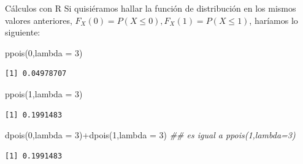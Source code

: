 \documentclass[
  ignorenonframetext,
  aspectratio=169]{beamer}
\newenvironment{Shaded}{\begin{snugshade}}{\end{snugshade}}
\newcommand{\AttributeTok}[1]{\textcolor[rgb]{0.40,0.45,0.13}{#1}}
\newcommand{\DecValTok}[1]{\textcolor[rgb]{0.68,0.00,0.00}{#1}}
\newcommand{\DocumentationTok}[1]{\textcolor[rgb]{0.37,0.37,0.37}{\textit{#1}}}
\newcommand{\FunctionTok}[1]{\textcolor[rgb]{0.28,0.35,0.67}{#1}}
\newcommand{\NormalTok}[1]{\textcolor[rgb]{0.00,0.23,0.31}{#1}}
\newcommand{\SpecialCharTok}[1]{\textcolor[rgb]{0.37,0.37,0.37}{#1}}
\begin{document}
\begin{frame}[fragile]{Cálculos con R}
\protect\hypertarget{cuxe1lculos-con-r-5}{}
Si quisiéramos hallar la función de distribución en los mismos valores
anteriores, \(F_X(0)=P(X\leq 0), F_X(1)=P(X\leq 1)\), haríamos lo
siguiente:

\begin{Shaded}
\begin{Highlighting}[]
\FunctionTok{ppois}\NormalTok{(}\DecValTok{0}\NormalTok{,}\AttributeTok{lambda =} \DecValTok{3}\NormalTok{)}
\end{Highlighting}
\end{Shaded}

\begin{verbatim}
[1] 0.04978707
\end{verbatim}

\begin{Shaded}
\begin{Highlighting}[]
\FunctionTok{ppois}\NormalTok{(}\DecValTok{1}\NormalTok{,}\AttributeTok{lambda =} \DecValTok{3}\NormalTok{)}
\end{Highlighting}
\end{Shaded}

\begin{verbatim}
[1] 0.1991483
\end{verbatim}

\begin{Shaded}
\begin{Highlighting}[]
\FunctionTok{dpois}\NormalTok{(}\DecValTok{0}\NormalTok{,}\AttributeTok{lambda =} \DecValTok{3}\NormalTok{)}\SpecialCharTok{+}\FunctionTok{dpois}\NormalTok{(}\DecValTok{1}\NormalTok{,}\AttributeTok{lambda =} \DecValTok{3}\NormalTok{) }\DocumentationTok{\#\# es igual a ppois(1,lambda=3)}
\end{Highlighting}
\end{Shaded}

\begin{verbatim}
[1] 0.1991483
\end{verbatim}
\end{frame}
\end{document}

